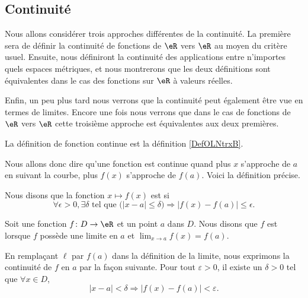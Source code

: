 
\subsection{Continuité}

Nous allons considérer trois approches différentes de la continuité. La première sera de définir la continuité de fonctions de $\eR$ vers $\eR$ au moyen du critère usuel. Ensuite, nous définiront la continuité des applications entre n'importes quels espaces métriques, et nous montrerons que les deux définitions sont équivalentes dans le cas des fonctions sur $\eR$ à valeurs réelles.

Enfin, un peu plus tard nous verrons que la continuité peut également être vue en termes de limites. Encore une fois nous verrons que dans le cas de fonctions de $\eR$ vers $\eR$ cette troisième approche est équivalentes aux deux premières.

La définition de fonction continue est la définition \ref{DefOLNtrxB}.

Nous allons donc dire qu'une fonction est continue quand plus $x$ s'approche de $a$ en suivant la courbe, plus $f(x)$ s'approche de $f(a)$. Voici la définition précise.
\begin{definition}      \label{DefContinue}
Nous disons que la fonction $x\mapsto f(x)$ est  si
\begin{equation}
 \forall \epsilon>0,\exists \delta\text{ tel que } \big(| x-a |\leq\delta\big)\Rightarrow | f(x)-f(a) |\leq \epsilon.
\end{equation}
\end{definition}


\begin{definition}		\label{DefFonctContinueRR}
	Soit une fonction $f\colon D\to \eR$ et un point $a$ dans $D$. Nous disons que $f$ est  lorsque $f$ possède une limite en $a$ et $\lim_{x\to a} f(x)=f(a)$.
\end{definition}
En remplaçant $\ell$ par $f(a)$ dans la définition de la limite, nous exprimons la continuité de $f$ en $a$ par la façon suivante. Pour tout $\varepsilon>0$, il existe un $\delta>0$ tel que $\forall x\in D$,
\begin{equation}
	| x-a |<\delta\Rightarrow \big| f(x)-f(a) \big|<\varepsilon.
\end{equation}


